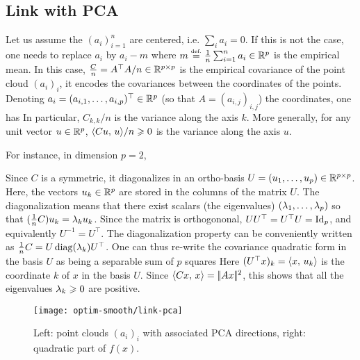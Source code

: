 \subsection{Link with PCA}

Let us assume the $(a_i)_{i=1}^n$ are centered, i.e. $\sum_i a_i=0$. If this is not the case, one needs to replace
 $a_i$ by $a_i - m$ where $m \stackrel{\mbox{\upshape\tiny def.}}{=} \frac{1}{n}\sum_{i=1}^n a_i \in \mathbb{R}^p$ is the empirical mean. In this case, $\frac{C}{n} = A^\top A/n \in \mathbb{R}^{p \times p}$ is the empirical covariance of the point cloud $(a_i)_i$, it encodes the covariances between the coordinates of the points. Denoting $a_i = (a_{i,1},\ldots,a_{i,p})^\top \in \mathbb{R}^p$ (so that $A=(a_{i,j})_{i,j}$) the coordinates, one has
 In particular, $C_{k,k}/n$ is the variance along the axis $k$. More generally, for any unit vector $u \in \mathbb{R}^p$, $\langle C u,\,u\rangle/n \geqslant 0$ is the variance along the axis $u$.
 
For instance, in dimension $p=2$, 

Since $C$ is a symmetric, it diagonalizes in an ortho-basis $U=(u_1,\ldots,u_p) \in \mathbb{R}^{p \times p}$. Here, the vectors $u_k \in \mathbb{R}^p$ are stored in the columns of the matrix $U$. The diagonalization means that there exist scalars (the eigenvalues) $(\lambda_1,\ldots,\lambda_p)$ so that $(\frac{1}{n} C) u_k = \lambda_k u_k$. Since the matrix is orthogononal, $UU^\top = U^\top U = \mathrm{Id}_p$, and equivalently $U^{-1}=U^\top$. The diagonalization property can be conveniently written as $\frac{1}{n} C=U \operatorname{diag}(\lambda_k) U^\top$. One can thus re-write the covariance quadratic form in the basis $U$ as being a separable sum of $p$ squares
Here $( U^\top x )_k = \langle x,\,u_k\rangle$ is the coordinate $k$ of $x$ in the basis $U$. Since $\langle Cx,\,x\rangle=|\!| Ax |\!|^2$, this shows that all the eigenvalues $\lambda_k \geqslant 0$ are positive. 

\begin{figure}
\centering
\texttt{[image: optim-smooth/link-pca]}
\caption{\label{fig-link-pca}
Left: point clouds $(a_i)_i$ with associated PCA directions, right: quadratic part of $f(x)$.
}
\end{figure}

